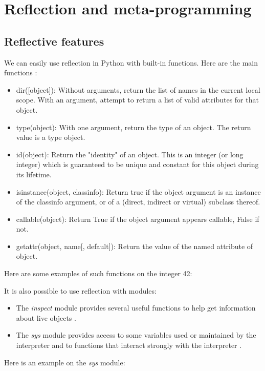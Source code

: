 \section{Reflection and meta-programming}
\subsection{Reflective features}
\label{reflection}
We can easily use reflection in Python with built-in functions. Here are the main functions \cite{python_doc_functions}:
\begin{itemize}
    \item dir([object]): Without arguments, return the list of names in the current local scope. With an argument, attempt to return a list of valid attributes for that object.
    \item type(object): With one argument, return the type of an object. The return value is a type object.
    \item id(object): Return the "identity" of an object. This is an integer (or long integer) which is guaranteed to be unique and constant for this object during its lifetime.
    \item isinstance(object, classinfo): Return true if the object argument is an instance of the classinfo argument, or of a (direct, indirect or virtual) subclass thereof.
    \item callable(object): Return True if the object argument appears callable, False if not.
    \item getattr(object, name[, default]): Return the value of the named attribute of object.
\end{itemize}

Here are some examples of such functions on the integer 42:


It is also possible to use reflection with modules:
\begin{itemize}
    \item The \textit{inspect} module provides several useful functions to help get information about live objects \cite{python_doc_inspect}. \item The \textit{sys} module provides access to some variables used or maintained by the interpreter and to functions that interact strongly with the interpreter \cite{python_doc_sys}.
\end{itemize}

Here is an example on the \textit{sys} module:


